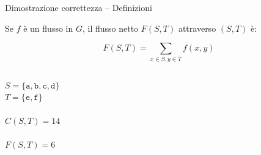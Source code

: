 \begin{frame}{Dimostrazione correttezza -- Definizioni}

\vspace{-9pt}
\begin{myboxtitle}
Se $f$ è un flusso in $G$, il \alert{flusso netto} $F(S,T)$ 
attraverso $(S,T)$ è:

\[
  F(S,T) = \sum_{x \in S, y \in T} f(x,y)
\]
\end{myboxtitle}

\vspace{-12pt}
\begin{columns}[T]
\vspace{18pt}
$S = \{ \mathtt{a}, \mathtt{b}, \mathtt{c}, \mathtt{d} \}$\\
$T = \{ \mathtt{e}, \mathtt{f} \}$\\
~\\
$C(S,T) = 14$\\
~\\
$F(S,T) = 6$
\end{columns}

\end{frame}

